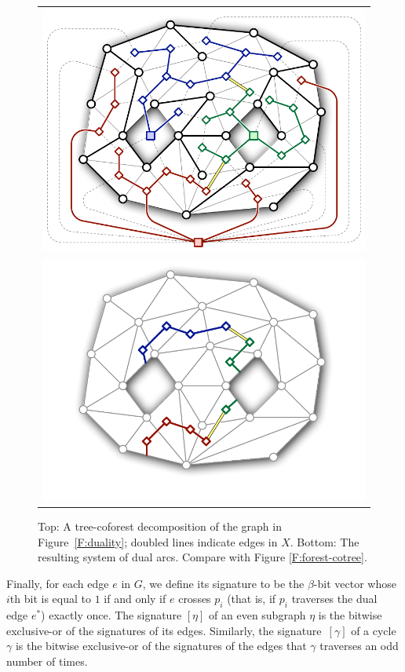 \documentclass[twoside,leqno,twocolumn]{article}
\let\cycle\gamma
\def\dualarc{p}
\begin{document}
\begin{figure}[htb]
\centering\footnotesize\sf
\begin{tabular}{c}
\includegraphics[scale=0.45]{Fig/tree-coforest2} \\
\includegraphics[scale=0.45]{Fig/tree-coforest-arcs2} \\[-3ex]
\end{tabular}
\caption{Top: A tree-coforest decomposition of the graph in Figure~\ref{F:duality}; doubled lines indicate edges in $X$.  Bottom: The resulting system of dual arcs.  Compare with Figure \ref{F:forest-cotree}.}
\label{F:tree-coforest}
\end{figure}

Finally, for each edge $e$ in $G$, we define its signature \EMPH{$[e]$} to be the $\beta$-bit vector whose $i$th bit is equal to $1$ if and only if $e$ crosses $\dualarc_i$ (that is, if $\dualarc_i$ traverses the dual edge $e^*$) exactly once.  The signature $[\eta]$ of an even subgraph $\eta$ is the bitwise exclusive-or of the signatures of its edges.  Similarly, the signature~$[\cycle]$ of a cycle $\cycle$ is the bitwise exclusive-or of the signatures of the edges that $\cycle$ traverses an odd number of times.
\end{document}

